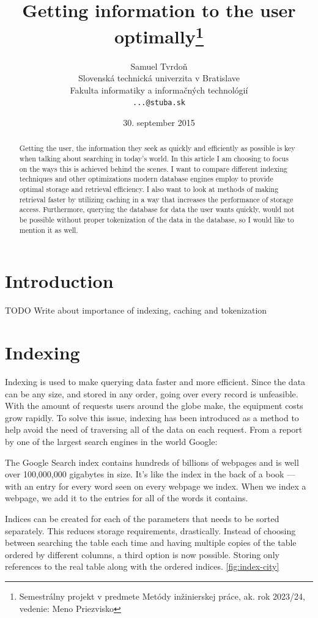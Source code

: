 \documentclass[10pt,a4paper]{article}
\title{Getting information to the user optimally\thanks{Semestrálny projekt v predmete Metódy inžinierskej práce, ak. rok 2023/24, vedenie: Meno Priezvisko}} %
\author{Samuel Tvrdoň\\[2pt]
	{\small Slovenská technická univerzita v Bratislave}\\
	{\small Fakulta informatiky a informačných technológií}\\
	{\small \texttt{...@stuba.sk}}
	}
\date{\small 30. september 2015} %
\begin{document}
\maketitle

\begin{abstract}
Getting the user, the information they seek as quickly and efficiently as possible is key when talking about searching in today’s world. In this article I am choosing to focus on the ways this is achieved behind the scenes. I want to compare different indexing techniques and other optimizations modern database engines employ to provide optimal storage and retrieval efficiency. I also want to look at methods of making retrieval faster by utilizing caching in a way that increases the performance of storage access. Furthermore, querying the database for data the user wants quickly, would not be possible without proper tokenization of the data in the database, so I would like to mention it as well.
\end{abstract}

\section{Introduction}
\cite{Database-indexing:-yesterday-and-today}
TODO Write about importance of indexing, caching and tokenization

\section{Indexing}
Indexing is used to make querying data faster and more efficient. Since the data can be any size,
and stored in any order, going over every record is unfeasible. With the amount of requests users around the globe make, the equipment costs grow rapidly. To solve this issue, indexing has been introduced as a method to help avoid the need of traversing all of the data on each request. From a report by one of the largest search engines in the world Google\cite{Google}:
\begin{displayquote}
The Google Search index contains hundreds of billions of webpages and is well over 100,000,000 gigabytes in size. It’s like the index in the back of a book — with an entry for every word seen on every webpage we index. When we index a webpage, we add it to the entries for all of the words it contains.
\end{displayquote}

Indices can be created for each of the parameters that needs to be sorted separately. This reduces storage requirements, drastically. Instead of choosing between searching the table each time and having multiple copies of the table ordered by different columns, a third option is now possible. Storing only references to the real table along with the ordered indices. \ref{fig:index-city}
\end{document}
